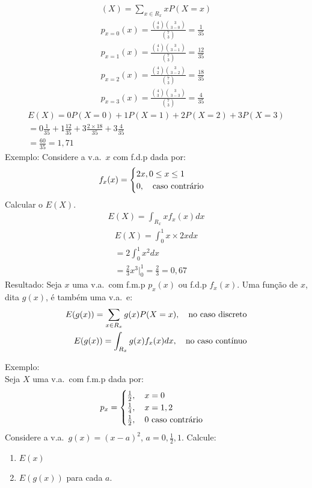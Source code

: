 \documentclass[11pt,a4paper]{article}
\begin{document}
\begin{align}
  (X)=\sum_{x \in R_{x}} x P(X=x)\\
  p_{x=0}(x)=\frac{\binom{4}{0}\binom{3}{3-0}}{\binom{7}{3}}=\frac{1}{35}\\
  p_{x=1}(x)=\frac{\binom{4}{1}\binom{3}{3-1}}{\binom{7}{3}}=\frac{12}{35}\\
  p_{x=2}(x)=\frac{\binom{4}{2}\binom{3}{3-2}}{\binom{7}{3}}=\frac{18}{35}\\
  p_{x=3}(x)=\frac{\binom{4}{3}\binom{3}{3-3}}{\binom{7}{3}}=\frac{4}{35}
\end{align}
\begin{align}
  E(X)=0 P(X=0)+1 P(X=1)+2 P(X=2)+3 P(X=3)\\
  =0 \frac{1}{35}+1 \frac{12}{35}+3 \frac{2\times 18}{35}+ 3 \frac{4}{35}\\
  =\frac{60}{35}=1,71
\end{align}
Exemplo: Considere a v.a.\ $x$ com f.d.p dada por: 
\begin{align}
  f_{x}(x)=\begin{cases}
    2x, 0\le x \le 1 \\
    0, \text{\quad caso contrário}
  \end{cases}
\end{align}
Calcular o $E(X)$.
\begin{align}
  E(X)=\int_{R_{x}} x f_{x}(x)dx
\end{align}
\begin{align}
  E(X)=\int_{0}^{1} x\times 2xdx\\
  = 2 \int_{0}^{1} x^{2}dx \\
  = \frac{2}{3} x^{3} |^1_0 = \frac{2}{3}=0,67
\end{align}
Resultado: Seja $x$ uma v.a.\ com f.m.p $p_{x}(x)$ ou f.d.p $f_{x}(x)$. Uma função
de $x$, dita $g(x)$, é também uma v.a.\ e: 
\begin{align}
  E(g(x))=\sum_{x \in R_{x}} g(x)P(X=x), \text{\quad no caso discreto}\\
  E(g(x))=\int_{R_{x}} g(x)f_{x}(x)dx, \text{\quad no caso contínuo}
\end{align}

Exemplo:\\ Seja $X$ uma v.a.\ com f.m.p dada por: 
\begin{align}
  p_{x}=\begin{cases}
    \frac{1}{2}, \text{\quad} x=0\\
    \frac{1}{4}, \text{\quad}x=1,2\\
    \frac{1}{2}, \text{\quad 0 caso contrário}
  \end{cases}
\end{align}
Considere a v.a.\ $g(x)={(x-a)}^2$, $a=0,\frac{1}{2},1$. Calcule: 
\begin{enumerate}[label=(\alph*)]
  \item $E(x)$
  \item $E(g(x))$ para cada $a$.
\end{enumerate}
\end{document}
